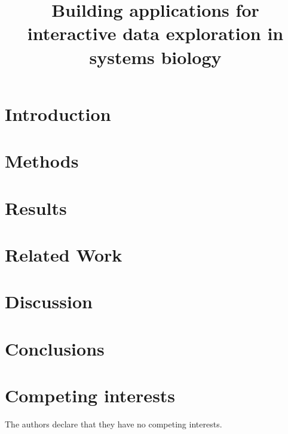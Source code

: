 \documentclass[sigconf]{acmart}
\begin{document}
\title{Building applications for interactive data exploration in systems biology}

 
 

\maketitle

\section*{Introduction}
 

\section*{Methods} 
 

\section*{Results}
 

\section*{Related Work}
 

\section*{Discussion} 
 

\section*{Conclusions}
 

\section*{Competing interests}
The authors declare that they have no competing interests.



\end{document}
